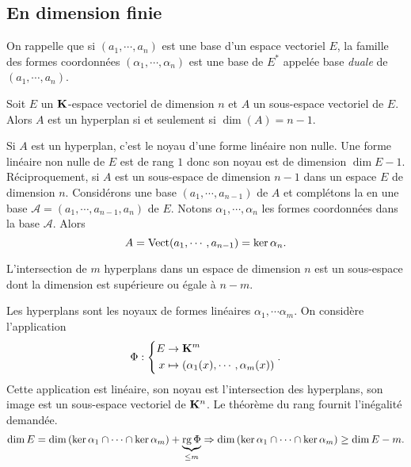 \subsection{En dimension finie}
On rappelle que si $(a_1,\cdots,a_n)$ est une base d'un espace vectoriel $E$, la famille des formes coordonnées $(\alpha_1,\cdots,\alpha_n)$ est une base de $E^*$ appelée base \emph{duale} de $(a_1,\cdots,a_n)$.
\begin{propn}
  Soit $E$ un $\mathbf{K}$-espace vectoriel de dimension $n$ et $A$ un sous-espace vectoriel de $E$. Alors $A$ est un hyperplan si et seulement si $\dim(A)=n-1$.
\end{propn}
\begin{demo}
Si $A$ est un hyperplan, c'est le noyau d'une forme linéaire non nulle. Une forme linéaire non nulle de $E$ est de rang $1$ donc son noyau est de dimension $\dim E -1$.\newline
Réciproquement, si $A$ est un sous-espace de dimension $n-1$ dans un espace $E$ de dimension $n$. Considérons une base $(a_1,\cdots, a_{n-1})$ de $A$ et complétons la en une base $\mathcal{A}=(a_1,\cdots, a_{n-1},a_n)$ de $E$. Notons $\alpha_1, \cdots, \alpha_n$ les formes coordonnées dans la base $\mathcal{A}$. Alors
\[
  A = \mathop{\mathrm{Vect}}(a_1, \cdots, a_{n-1}) = \ker \alpha_n .
\]

\end{demo}

\begin{propn}\label{interhypsup}
 L'intersection de $m$ hyperplans dans un espace de dimension $n$ est un sous-espace dont la dimension est supérieure ou égale à $n-m$.
\end{propn}
\begin{demo}
Les hyperplans sont les noyaux de formes linéaires $\alpha_1,\cdots \alpha_m$. On considère l'application 
\begin{displaymath}
  \Phi:
\left\lbrace 
\begin{aligned}
  E &\rightarrow \mathbf{K}^m \\ x&\mapsto (\alpha_1(x),\cdots,\alpha_m(x))
\end{aligned}
\right. .
\end{displaymath}
Cette application est linéaire, son noyau est l'intersection des hyperplans, son image est un sous-espace vectoriel de $\mathbf{K}^n$. Le théorème du rang fournit l'inégalité demandée.
\begin{displaymath}
\dim E = \dim\left( \ker \alpha_1 \cap \cdots \cap \ker \alpha_m\right) + \underset{\leq m}{\underbrace{\mathop{\mathrm{rg}} \Phi}}
\Rightarrow
\dim\left( \ker \alpha_1 \cap \cdots \cap \ker \alpha_m\right) \geq \dim E -m .
\end{displaymath}
\end{demo}

